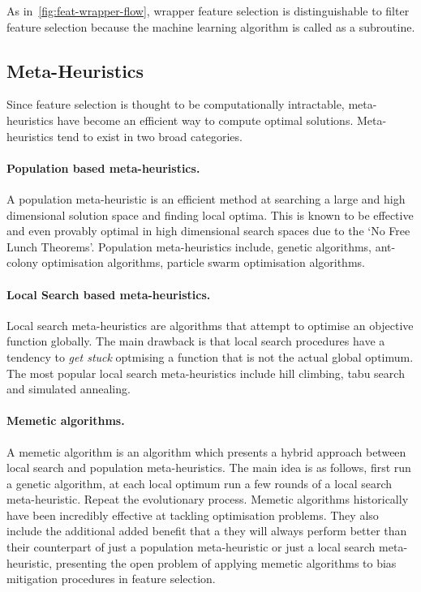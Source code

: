 \documentclass[conference]{IEEEtran}
\begin{document}
As in~\autoref{fig:feat-wrapper-flow}, wrapper feature selection is distinguishable to filter feature selection because the machine learning algorithm is called as a subroutine.

\subsection{Meta-Heuristics}

Since feature selection is thought to be computationally intractable, meta-heuristics have become an efficient way to compute optimal solutions. Meta-heuristics tend to exist in two broad categories.

\paragraph{Population based meta-heuristics.} A population meta-heuristic is an efficient method at searching a large and high dimensional solution space and finding local optima. This is known to be effective and even provably optimal in high dimensional search spaces due to the `No Free Lunch Theorems'. Population meta-heuristics include, genetic algorithms, ant-colony optimisation algorithms, particle swarm optimisation algorithms.

\paragraph{Local Search based meta-heuristics.} Local search meta-heuristics are algorithms that attempt to optimise an objective function globally. The main drawback is that local search procedures have a tendency to \textit{get stuck} optmising a function that is not the actual global optimum. The most popular local search meta-heuristics include hill climbing, tabu search and simulated annealing.

\paragraph{Memetic algorithms.} A memetic algorithm is an algorithm which presents a hybrid approach between local search and population meta-heuristics. The main idea is as follows, first run a genetic algorithm, at each local optimum run a few rounds of a local search meta-heuristic. Repeat the evolutionary process. Memetic algorithms historically have been incredibly effective at tackling optimisation problems. They also include the additional added benefit that a they will always perform better than their counterpart of just a population meta-heuristic or just a local search meta-heuristic, presenting the open problem of applying memetic algorithms to bias mitigation procedures in feature selection.
\end{document}
